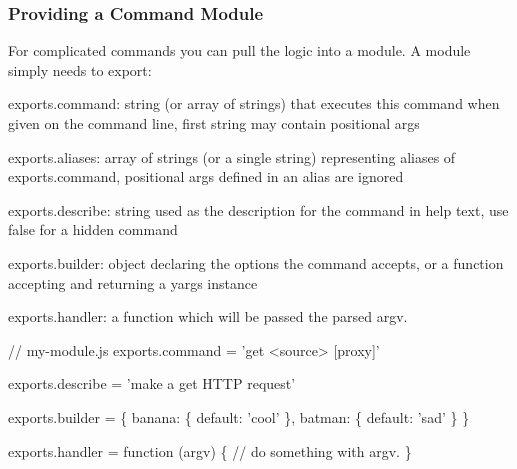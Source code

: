 

\subsubsection*{Providing a Command Module}

For complicated commands you can pull the logic into a module. A module simply needs to export\+:


\begin{DoxyItemize}
\item {\ttfamily exports.\+command}\+: string (or array of strings) that executes this command when given on the command line, first string may contain positional args
\item {\ttfamily exports.\+aliases}\+: array of strings (or a single string) representing aliases of {\ttfamily exports.\+command}, positional args defined in an alias are ignored
\item {\ttfamily exports.\+describe}\+: string used as the description for the command in help text, use {\ttfamily false} for a hidden command
\item {\ttfamily exports.\+builder}\+: object declaring the options the command accepts, or a function accepting and returning a yargs instance
\item {\ttfamily exports.\+handler}\+: a function which will be passed the parsed argv.
\end{DoxyItemize}


\begin{DoxyCode}
// my-module.js
exports.command = 'get <source> [proxy]'

exports.describe = 'make a get HTTP request'

exports.builder = \{
  banana: \{
    default: 'cool'
  \},
  batman: \{
    default: 'sad'
  \}
\}

exports.handler = function (argv) \{
  // do something with argv.
\}
\end{DoxyCode}


